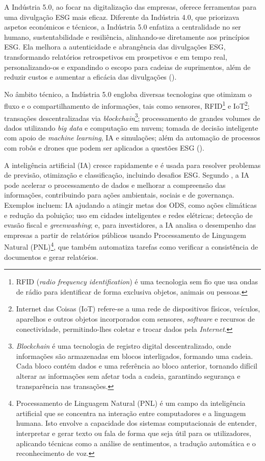 A Indústria 5.0, ao focar na digitalização das empresas, oferece ferramentas para uma divulgação ESG mais eficaz. Diferente da Indústria 4.0, que priorizava aspetos económicos e técnicos, a Indústria 5.0 enfatiza a centralidade no ser humano, sustentabilidade e resiliência, alinhando-se diretamente aos princípios ESG. Ela melhora a autenticidade e abrangência das divulgações ESG, transformando relatórios retrospetivos em prospetivos e em tempo real, personalizando-os e expandindo o escopo para cadeias de suprimentos, além de reduzir custos e aumentar a eficácia das divulgações (\cite{Asif2023}).

No âmbito técnico, a Indústria 5.0 engloba diversas tecnologias que otimizam o fluxo e o compartilhamento de informações, tais como sensores, RFID\footnote{RFID (\textit{radio frequency identification}) é uma tecnologia sem fio que usa ondas de rádio para identificar de forma exclusiva objetos, animais ou pessoas.} e IoT\footnote{Internet das Coisas (IoT) refere-se a uma rede de dispositivos físicos, veículos, aparelhos e outros objetos incorporados com sensores, \textit{software} e recursos de conectividade, permitindo-lhes coletar e trocar dados pela \textit{Internet}.}; transações descentralizadas via \textit{blockchain}\footnote{\textit{Blockchain} é uma tecnologia de registro digital descentralizado, onde informações são armazenadas em blocos interligados, formando uma cadeia. Cada bloco contém dados e uma referência ao bloco anterior, tornando difícil alterar as informações sem afetar toda a cadeia, garantindo segurança e transparência nas transações.}; processamento de grandes volumes de dados utilizando \textit{big data} e computação em nuvem; tomada de decisão inteligente com apoio de \textit{machine learning}, IA e simulações; além da automação de processos com robôs e drones que podem ser aplicados a questões ESG (\cite{Asif2023}).

A inteligência artificial (IA) cresce rapidamente e é usada para resolver problemas de previsão, otimização e classificação, incluindo desafios ESG. Segundo \cite{Burnaev2023}, a IA pode acelerar o processamento de dados e melhorar a compreensão das informações, contribuindo para ações ambientais, sociais e de governança. Exemplos incluem: IA ajudando a atingir metas dos ODS, como ações climáticas e redução da poluição; uso em cidades inteligentes e redes elétricas; detecção de evasão fiscal e \textit{greenwashing}; e, para investidores, a IA analisa o desempenho das empresas a partir de relatórios públicos usando Processamento de Linguagem Natural (PNL)\footnote{Processamento de Linguagem Natural (PNL) é um campo da inteligência artificial que se concentra na interação entre computadores e a linguagem humana. Isto envolve a capacidade dos sistemas computacionais de entender, interpretar e gerar texto ou fala de forma que seja útil para os utilizadores, aplicando técnicas como a análise de sentimentos, a tradução automática e o reconhecimento de voz.}, que também automatiza tarefas como verificar a consistência de documentos e gerar relatórios.

